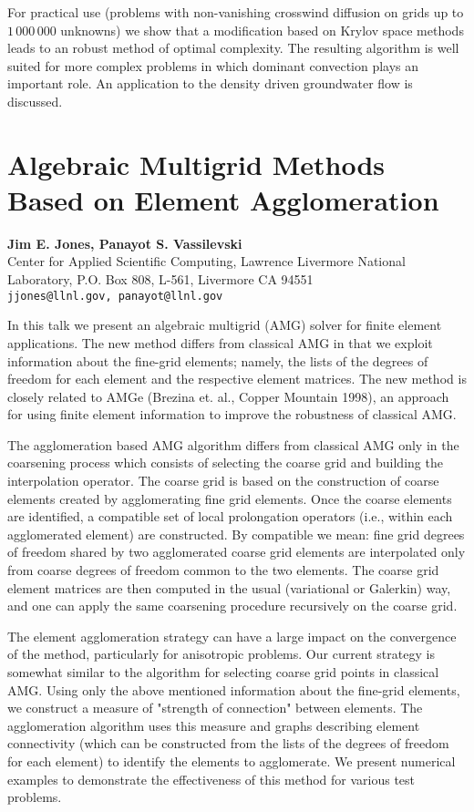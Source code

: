 \documentclass[11pt]{article}
\newcommand{\nextab}[4]{
	\section{#2}
	{\bf #1} \\ \nopagebreak
	{#3} \\ \nopagebreak
	{\tt #4} \nopagebreak
	}
\begin{document}
For practical use (problems with non-vanishing crosswind diffusion
on grids up to $1\,000\,000$ unknowns) we show that a modification based
on Krylov space methods leads to an robust method of optimal complexity.
The resulting algorithm is well suited for more complex problems in which
dominant convection plays an important role.
An application to the density driven groundwater flow is discussed.


\nextab{Jim E. Jones, Panayot S. Vassilevski}
	{Algebraic Multigrid Methods Based on Element Agglomeration}
	{Center for Applied Scientific Computing,
		Lawrence Livermore National Laboratory,
		P.O. Box 808, L-561, Livermore CA 94551}
	{jjones@llnl.gov, panayot@llnl.gov}

In this talk we present an algebraic multigrid (AMG)
solver for finite element applications. The new method differs
from classical AMG in that we exploit information about
the fine-grid elements; namely, the lists of the degrees of freedom
for each element and the respective element matrices. The new method
is closely related to AMGe (Brezina et. al., Copper Mountain 1998),
an approach for using finite element information to improve the
robustness of classical AMG.

The agglomeration based AMG algorithm differs from classical AMG
only in the coarsening process which consists of selecting the coarse
grid and building the interpolation operator. The coarse grid is
based on the construction of coarse elements created by agglomerating
fine grid elements. Once the coarse elements are identified,
a compatible set of local prolongation operators (i.e., within each
agglomerated element) are constructed. By compatible we mean: fine grid
degrees of freedom shared by two agglomerated coarse grid elements
are interpolated only from coarse degrees of freedom common to
the two elements. The coarse grid element matrices are then computed
in the usual (variational or Galerkin) way,
and one can apply the same coarsening procedure recursively on the coarse grid.

The element agglomeration strategy can have a large impact on the
convergence of the method, particularly for anisotropic problems.
Our current strategy is somewhat similar
to the algorithm for selecting coarse grid points in classical AMG.
Using only the above mentioned information about the fine-grid elements,
we construct a measure of "strength of connection" between elements.
The agglomeration algorithm uses this measure and graphs describing
element connectivity (which can be constructed from the
lists of the degrees of freedom for each element) to identify the elements
to agglomerate.
We present numerical examples to demonstrate the effectiveness of
this method for various test problems.
\end{document}
